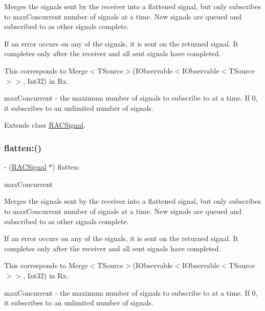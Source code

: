 Merges the signals sent by the receiver into a flattened signal, but only subscribes to {\ttfamily max\+Concurrent} number of signals at a time. New signals are queued and subscribed to as other signals complete.

If an error occurs on any of the signals, it is sent on the returned signal. It completes only after the receiver and all sent signals have completed.

This corresponds to {\ttfamily Merge$<$T\+Source$>$(I\+Observable$<$I\+Observable$<$T\+Source$>$$>$, Int32)} in Rx.

max\+Concurrent -\/ the maximum number of signals to subscribe to at a time. If 0, it subscribes to an unlimited number of signals. 

Extends class \mbox{\hyperlink{interface_r_a_c_signal_a72e5f2fd80960ee5422e08ceef0f4e2c}{R\+A\+C\+Signal}}.

\mbox{\label{category_r_a_c_signal_07_operations_08_a72e5f2fd80960ee5422e08ceef0f4e2c}} 
\subsubsection{\texorpdfstring{flatten\+:()}{flatten:()}\hspace{0.1cm}{\footnotesize\ttfamily [3/3]}}
{\footnotesize\ttfamily -\/ (\mbox{\hyperlink{interface_r_a_c_signal}{R\+A\+C\+Signal}} $\ast$) flatten\+: \begin{DoxyParamCaption}\item[{(N\+S\+U\+Integer)}]{max\+Concurrent }\end{DoxyParamCaption}}

Merges the signals sent by the receiver into a flattened signal, but only subscribes to {\ttfamily max\+Concurrent} number of signals at a time. New signals are queued and subscribed to as other signals complete.

If an error occurs on any of the signals, it is sent on the returned signal. It completes only after the receiver and all sent signals have completed.

This corresponds to {\ttfamily Merge$<$T\+Source$>$(I\+Observable$<$I\+Observable$<$T\+Source$>$$>$, Int32)} in Rx.

max\+Concurrent -\/ the maximum number of signals to subscribe to at a time. If 0, it subscribes to an unlimited number of signals. 

